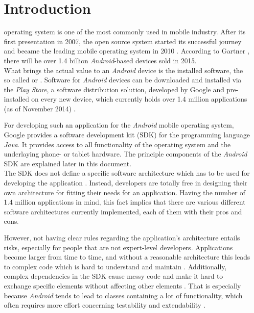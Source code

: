 \section{Introduction}

 operating system is one of the most 
commonly used in mobile industry. After its first presentation in 2007, the open source system started its successful journey and became the leading mobile operating system in 2010 \cite{PassiveMVC}. According to Gartner \cite{GartnerAndroid2015}, there will be over 1.4 billion \emph{Android}-based devices sold in 2015.\\

What brings the actual value to an \emph{Android} device is the installed software, the so called  or 
.
Software for \emph{Android} devices can be downloaded and installed via the 
\emph{Play Store}, a software distribution solution, developed by Google and 
pre-installed on every new device, which currently holds over 1.4 million 
applications (as of November 2014) \cite{AppBrainStats}.


For developing such an application for the \emph{Android} mobile operating 
system, Google provides a software development kit (SDK) for the programming 
language \emph{Java}. It provides access to all functionality of the 
operating system and the underlaying phone- or tablet hardware. The principle components of the \emph{Android} SDK are explained later in this document.\\


The SDK does not define a specific software architecture which has to 
be used for developing the application \cite{AndroidDeveloperCollection}. Instead, developers are totally free in 
designing their own architecture for fitting their needs for an application.
Having the number of 1.4 million applications in mind, this fact implies that 
there are various different software architectures currently implemented, each 
of them with their pros and cons. 

However, not having clear rules regarding the application's architecture entails risks, especially for people that are not expert-level developers. Applications become larger from time to time, and without a reasonable architecture this leads to complex code which is hard to understand and maintain \cite{PassiveMVC, BallOfMud}. Additionally, complex dependencies in the SDK cause messy code and make it hard to exchange specific elements without affecting other elements \cite{PassiveMVC}. That is especially because \emph{Android} tends to lead to classes containing a lot of functionality, which often requires more effort concerning testability and extendability \cite{GangOfFour}.

